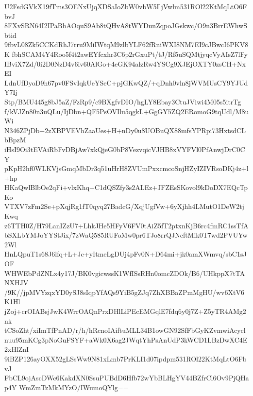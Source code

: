 U2FsdGVkX19fTms3OENxUjqXDSaIoZbW0vbW5IljVwlm531ROl22KtMqLtO6FbvJ
8FXvSRN64I2IPaBbAOquS9Ab8tQHvA8tWYDunZqpoJGskwc/O9n3BrrEWhwSbtid
9fbvL08Zk5CCKdRhJ7rru9MiIWtqM9zlbYLF62fRniWXI8NM7EI9cJBwcI6PKV8K
fbhSCAM4Y4Roo5f4t2awEYfcxhr3C6p2rGxuPt/tJ/Rf5uSQMtjyqcVyAIsZ7lFy
IBviX7Zd/0i2D0NzD4v6iv60AlGo+4eGK94alzRw4YSCg9XJEjOXTY0zsCH+NxEI
LdnUfDyoD9h67pv0FSvIqkUeYSeC+pjGKwQZ/+qDnh0vln8jWVMUsCY9YJUdY7Ij
Stp/BMU445g8bJ5aZ/FzRp9/c9BXgfvDIO/hgLY8Ebay3CtuJViwi4M05s5itrTg
f/kVJZn80n3uQLu/IjDbn+QF5PsOVIlu5qgkL+GgGY5ZQ2ERomoG9tqUdl/M8uWi
N346ZPjDb+2zXBPVEVhZaaUes+H+nDy0u8UOBuQX88mfsYPRpi73HxtsdCLbBpzM
iHsI9Oi3tEVAiRbFvDBjAw7xkQjeG0bP8VezvqicVJHB8xVYFVl0PfAnwjDrC0CY
pKpH2hf0WLKVjsGmqMbDr3q51uHrH8ZVUmPxxcmcoSnjHZyIZIVRsoDKj4z+l+hp
HKaQwlBlbOe2qFi+vlxKhq+C1dQSZfy3s2ALEz+JFZEsSKovol9kDoDX7EQcTpKo
VTXV7zFm2Se+pXqjRg1fT0qyq27BadcG/XqjUgfVw+6yXjhh4LMutO1DeW2tjKwq
z6TTH0Z/H79LanIZzU7+LhkJHe5HFyV6FV0tAiZ5fT2ptxnKjB6rc4fmRC1ssTfA
bSXLbYMJoYYStJix/7zWaQ585RUFoMw0pr6TJo8rrQJNcftMik0T7wd2PVUYw2Wl
HnLQpuT1s68J6lfq+L+Jc+yItmeLgDUj4pFv0N+D64mi+jk0amXWmvq/sbC1sJOF
WHWEbPdZNLx4y17J/BK0vgicwssK1WfISsRHn0omcZDOk/B6/UHkppX7tTANXHJV
/9K//jpMVYzqxYD0ySJ8sIqpYfAQs9YiB5gZJq7ZhXBBaZPmMgHU/wv6XtV6K1Hl
jZoj+crOIABsjJwK4WrrOAQnPrxDHlLiPEcEMGqlE7fdq6y0j7Z+Z5yTR4AMg2nk
tCSoZht/xiImTfPnAD/r/h/hRcnoIAiftuMLL34B1owGN92SfFbGyKZvmwiAcycl
nuu95mKCg3pNoGuFSYF+aWk0X6ag2JWqtYhPsAnUdP3kWCD1LBzDwXC4E2xHlZnI
9iBZP126ayOXX52gLSsWw9N81xLmb7PrKLI1d07ipdpm531ROl22KtMqLtO6FbvJ
FbCL9ojAscDWc6KakdXN0SsuPUBdD6Hfb72wYbBLHgYV44BZfrCl6Ov9PjQHap4Y
WmZmTzMkMYzO/IWumoQYlg==
